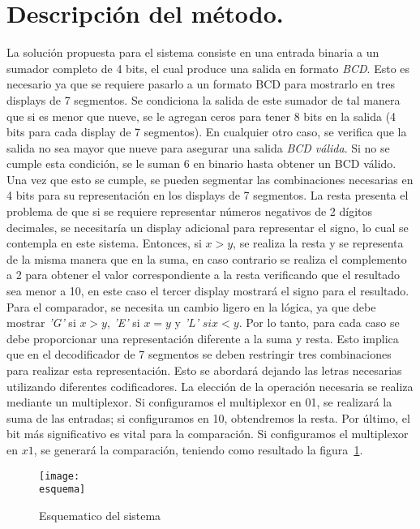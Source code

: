 \documentclass[a4paper, 12pt]{article}
\newcommand{\esquema}{img/esq.jpg}
\begin{document}
    \section{Descripción del método.}
    La solución propuesta para el sistema consiste en una entrada binaria a un sumador completo de 4 bits, el cual produce una salida en formato \emph{BCD}. Esto es necesario ya que se requiere pasarlo a un formato BCD para mostrarlo en tres displays de 7 segmentos. Se condiciona la salida de este sumador de tal manera que si es menor que nueve, se le agregan ceros para tener 8 bits en la salida (4 bits para cada display de 7 segmentos). En cualquier otro caso, se verifica que la salida no sea mayor que nueve para asegurar una salida \emph{BCD válida}. Si no se cumple esta condición, se le suman 6 en binario hasta obtener un BCD válido. Una vez que esto se cumple, se pueden segmentar las combinaciones necesarias en 4 bits para su representación en los displays de 7 segmentos.
    La resta presenta el problema de que si se requiere representar números negativos de 2 dígitos decimales, se necesitaría un display adicional para representar el signo, lo cual se contempla en este sistema. Entonces, si $x > y$, se realiza la resta y se representa de la misma manera que en la suma, en caso contrario se realiza el complemento a 2 para obtener el valor correspondiente a la resta verificando que el resultado sea menor a 10, en este caso el tercer display mostrará el signo para el resultado. 
    Para el comparador, se necesita un cambio ligero en la lógica, ya que debe mostrar \emph{'G'} si $x > y$, \emph{'E'} si $x = y$ y \emph{'L'} $si x < y$. Por lo tanto, para cada caso se debe proporcionar una representación diferente a la suma y resta. Esto implica que en el decodificador de 7 segmentos se deben restringir tres combinaciones para realizar esta representación. Esto se abordará dejando las letras necesarias utilizando diferentes codificadores.
    La elección de la operación necesaria se realiza mediante un multiplexor. Si configuramos el multiplexor en 01, se realizará la suma de las entradas; si configuramos en 10, obtendremos la resta. Por último, el bit más significativo es vital para la comparación. Si configuramos el multiplexor en $x1$, se generará la comparación, teniendo como resultado la figura~\ref{fig:top-level}.

    \begin{figure}[H]
        \centering
        \texttt{[image: \\esquema]}
        \caption{Esquematico del sistema}
        \label{fig:top-level}
    \end{figure}
\end{document}
